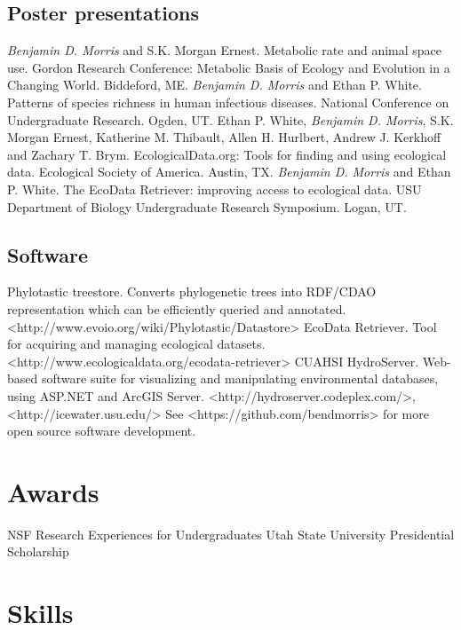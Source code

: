 \documentclass[11pt,letter]{moderncv}
\begin{document}
\subsection{Poster presentations}
 {
    \emph{Benjamin D. Morris} and S.K. Morgan Ernest. Metabolic rate and animal space use. Gordon Research Conference: Metabolic Basis of Ecology and Evolution in a Changing World. Biddeford, ME.
}
\cvline{} {
    \emph{Benjamin D. Morris} and Ethan P. White. Patterns of species richness in human infectious diseases. National Conference on Undergraduate Research. Ogden, UT.
}
 {
    Ethan P. White, \emph{Benjamin D. Morris}, S.K. Morgan Ernest, Katherine M. Thibault, Allen H. Hurlbert, Andrew J. Kerkhoff and Zachary T. Brym. EcologicalData.org: Tools for finding and using ecological data. Ecological Society of America. Austin, TX.
}
 {
    \emph{Benjamin D. Morris} and Ethan P. White. The EcoData Retriever: improving access to ecological data. USU Department of Biology Undergraduate Research Symposium. Logan, UT.
}


\subsection{Software}
 {
    Phylotastic treestore. Converts phylogenetic trees into RDF/CDAO representation which can be efficiently
    queried and annotated.
    \newline <http://www.evoio.org/wiki/Phylotastic/Datastore>
}
\cvline{} {
    EcoData Retriever. Tool for acquiring and managing ecological datasets.
    \newline <http://www.ecologicaldata.org/ecodata-retriever>
}
 {
    CUAHSI HydroServer. Web-based software suite for visualizing and manipulating environmental databases, using ASP.NET and ArcGIS Server.
    \newline <http://hydroserver.codeplex.com/>, <http://icewater.usu.edu/>
}
 {
    See <https://github.com/bendmorris> for more open source software development.
}


\section{Awards}
 {NSF Research Experiences for Undergraduates}
 {Utah State University Presidential Scholarship}


\section{Skills}
\end{document}
